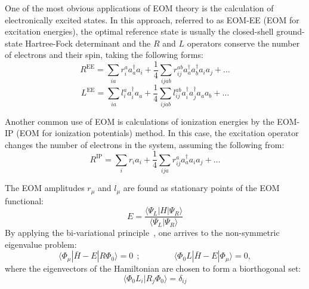 \documentclass[journal=jctcce,manuscript=article]{achemso}
\begin{document}
One of the most obvious applications of EOM theory is the calculation of electronically excited states\cite{sekino1984linear,Stanton:93:EOMCC}. In this approach, referred to as EOM-EE (EOM for excitation energies), the optimal reference state is usually the closed-shell ground-state Hartree-Fock determinant and the $R$ and $L$ operators conserve the number of electrons and their spin, taking the following forms:
\begin{equation}
R^\text{EE}= \sum_{ia} r_i^a a_a^\dagger a_i + \frac{1}{4} \sum_{ijab} r_{ij}^{ab} a_a^\dagger a_b^\dagger a_i a_j + \dots
\end{equation}
\begin{equation}
L^\text{EE}= \sum_{ia} l_i^a a_i^\dagger a_a + \frac{1}{4} \sum_{ijab} l_{ij}^{ab} a_i^\dagger a_j^\dagger a_a a_b + \dots
\end{equation}

Another common use of EOM is calculations of ionization energies by the EOM-IP (EOM for ionization potentials)
method\cite{Stanton:94:AnlDer,Stanton:EOMRev:03,PAP:EOMIP}. In this case, the excitation operator changes the number of electrons in the system, assuming the 
following from:
\begin{equation}
R^\text{IP}= \sum_{i} r_i a_i + \frac{1}{4} \sum_{ija} r_{ij}^{a} a_a^\dagger  a_i a_j + \dots
\end{equation}

The EOM amplitudes $r_\mu$ and $l_\mu$ are found as stationary points of the EOM functional:
\begin{equation}
E = \frac{\langle \Psi_L| H | \Psi_R \rangle}{\langle \Psi_L | \Psi_R \rangle} 
\end{equation}
By applying the bi-variational principle~\cite{Bivariational_Lowdin,levchenko2004equation}, one arrives  
to the non-symmetric eigenvalue problem:
\begin{equation}
\langle \Phi_\mu | \bar{H} - E | R \Phi_0 \rangle = 0~~; 
\qquad\qquad
\langle \Phi_0 L | \bar{H} - E | \Phi_\mu \rangle = 0, 
\end{equation}
where the eigenvectors of the Hamiltonian are chosen to form a biorthogonal set\cite{Stanton:93:EOMCC}: 
\begin{equation}
\langle \Phi_0 L_i| R_j \Phi_0 \rangle = \delta_{ij}
\end{equation}
\end{document}
